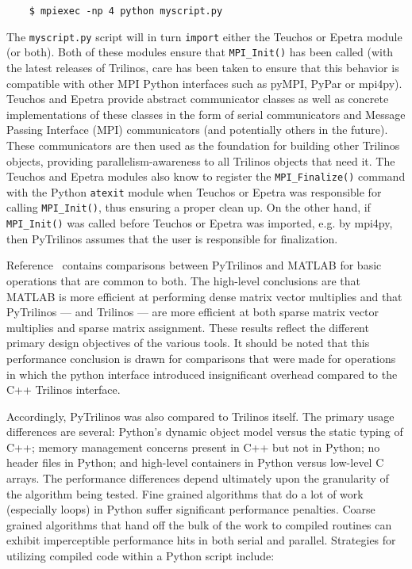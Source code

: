 \documentclass[11pt]{article}
\begin{document}
\begin{verbatim}
    $ mpiexec -np 4 python myscript.py
\end{verbatim}

The {\tt myscript.py} script will in turn {\tt import} either the Teuchos or Epetra module (or both).  Both of these modules ensure that {\tt MPI\_Init()} has been called (with the latest releases of Trilinos, care has been taken to ensure that this behavior is compatible with other MPI Python interfaces such as pyMPI, PyPar or mpi4py).  Teuchos and Epetra provide abstract communicator classes as well as concrete implementations of these classes in the form of serial communicators and Message Passing Interface (MPI) communicators (and potentially others in the future).  These communicators are then used as the foundation for building other Trilinos objects, providing parallelism-awareness to all Trilinos objects that need it.  The Teuchos and Epetra modules also know to register the {\tt MPI\_Finalize()} command with the Python {\tt atexit} module when Teuchos or Epetra was responsible for calling {\tt MPI\_Init()}, thus ensuring a proper clean up.  On the other hand, if {\tt MPI\_Init()} was called before Teuchos or Epetra was imported, e.g. by mpi4py, then PyTrilinos assumes that the user is responsible for finalization.

Reference~\cite{PyTrilinos} contains comparisons between PyTrilinos and MATLAB for basic operations that are common to both.  The high-level conclusions are that MATLAB is more efficient at performing dense matrix vector multiplies and that PyTrilinos --- and Trilinos --- are more efficient at both sparse matrix vector multiplies and sparse matrix assignment.  These results reflect the different primary design objectives of the various tools.  It should be noted that this performance conclusion is drawn for comparisons that were made for operations in which the python interface introduced insignificant overhead compared to the C++ Trilinos interface.

Accordingly, PyTrilinos was also compared to Trilinos itself.  The primary usage differences are several: Python's dynamic object model versus the static typing of C++; memory management concerns present in C++ but not in Python; no header files in Python; and high-level containers in Python versus low-level C arrays.  The performance differences depend ultimately upon the granularity of the algorithm being tested.  Fine grained algorithms that do a lot of work (especially loops) in Python suffer significant performance penalties.  Coarse grained algorithms that hand off the bulk of the work to compiled routines can exhibit imperceptible performance hits in both serial and parallel.  Strategies for utilizing compiled code within a Python script include:
\end{document}
